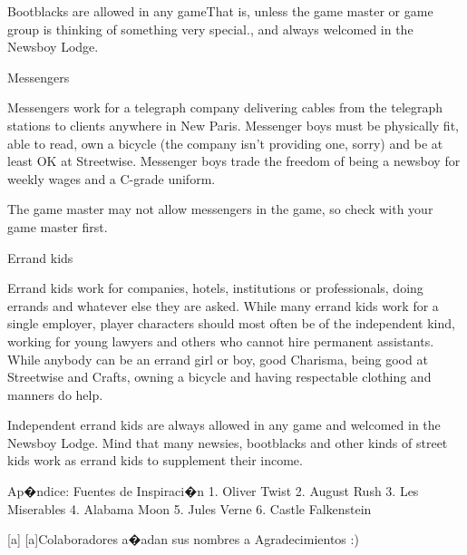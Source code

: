Bootblacks are allowed in any gameThat is, unless the game master or game group is thinking of something very special., and always welcomed in the Newsboy Lodge.


Messengers


Messengers work for a telegraph company delivering cables from the telegraph stations to clients anywhere in New Paris. Messenger boys must be physically fit, able to read, own a bicycle (the company isn't providing one, sorry) and be at least OK at Streetwise. Messenger boys trade the freedom of being a newsboy for weekly wages and a C-grade uniform.


The game master may not allow messengers in the game, so check with your game master first.


Errand kids


Errand kids work for companies, hotels, institutions or professionals, doing errands and whatever else they are asked. While many errand kids work for a single employer, player characters should most often be of the independent kind, working for young lawyers and others who cannot hire permanent assistants. While anybody can be an errand girl or boy, good Charisma, being good at Streetwise and Crafts, owning a bicycle and having respectable clothing and manners do help.


Independent errand kids are always allowed in any game and welcomed in the Newsboy Lodge. Mind that many newsies, bootblacks and other kinds of street kids work as errand kids to supplement their income.




Ap�ndice: Fuentes de Inspiraci�n
1. Oliver Twist
2. August Rush
3. Les Miserables
4. Alabama Moon
5. Jules Verne
6. Castle Falkenstein










[a]
[a]Colaboradores a�adan sus nombres a Agradecimientos :)